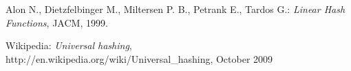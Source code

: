 \begin{thebibliography}{99}
 
 Alon N., Dietzfelbinger M., Miltersen P. B., Petrank E., Tardos G.: {\em Linear Hash Functions}, JACM, 1999.

  \begin{flushleft}
	Wikipedia: {\em Universal hashing},\\
	http://en.wikipedia.org/wiki/Universal{\_}hashing, October 2009
  \end{flushleft}

\end{thebibliography}

